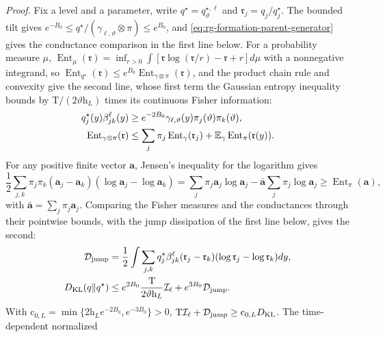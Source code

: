 \noindent\emph{Proof.}
Fix a level and a parameter, write \(q^\star=q^{\star,\ell}_\vartheta\) and
\(\mathfrak r_j=q_j/q^\star_j\). The bounded tilt gives
\(e^{-B_0}\le q^\star/(\gamma_{\ell,\vartheta}\otimes\pi)\le e^{B_0}\), and
\cref{eq:rg-formation-parent-generator} gives the conductance comparison in the
first line below. For a probability measure \(\mu\),
\(\operatorname{Ent}_\mu(\mathfrak r)=\inf_{r>0}\int[\mathfrak r\log(\mathfrak r/r)-\mathfrak r+r] d\mu\)
with a nonnegative integrand, so
\(\operatorname{Ent}_{q^\star}(\mathfrak r)\le e^{B_0}\operatorname{Ent}_{\gamma\otimes\pi}(\mathfrak r)\),
and the product chain rule and convexity give the second line, whose first
term the Gaussian entropy inequality bounds by
\(\mathrm T/(2\vartheta\mathrm h_L)\) times its continuous Fisher information:
\begin{align}
 q^\star_j(y)\beta_{jk}^\ell(y)
 &\ge e^{-2B_0}\gamma_{\ell,\vartheta}(y)\pi_j(\vartheta)\pi_k(\vartheta),
 \label{eq:rg-formation-conductance-comparison}\\
 \operatorname{Ent}_{\gamma\otimes\pi}(\mathfrak r)
 &\le\sum_j\pi_j\operatorname{Ent}_\gamma(\mathfrak r_j)
   +\mathbb E_\gamma\operatorname{Ent}_{\pi}(\mathfrak r(y)).
 \label{eq:rg-formation-product-entropy-bound}
\end{align}
For any positive finite vector \(\mathbf a\), Jensen's inequality for the
logarithm gives
\begin{equation}
 \frac12\sum_{j,k}\pi_j\pi_k
       (\mathbf a_j-\mathbf a_k)(\log\mathbf a_j-\log\mathbf a_k)
 =\sum_j\pi_j\mathbf a_j\log\mathbf a_j
       -\bar{\mathbf a}\sum_j\pi_j\log\mathbf a_j
 \ge \operatorname{Ent}_\pi(\mathbf a),
 \label{eq:rg-formation-categorical-entropy-bound}
\end{equation}
with \(\bar{\mathbf a}=\sum_j\pi_j\mathbf a_j\). Comparing the Fisher measures
and the conductances through their pointwise bounds, with the jump
dissipation of the first line below, gives the second:
\begin{align}
 \mathcal D_{\mathrm{jump}}
 &=\frac12\int\sum_{j,k}q^\star_j\beta_{jk}^\ell
           (\mathfrak r_j-\mathfrak r_k)(\log\mathfrak r_j-\log\mathfrak r_k) dy,
 \label{eq:rg-formation-jump-dissipation}\\
 D_{\mathrm{KL}}(q\Vert q^\star)&\le
 e^{2B_0}\frac{\mathrm T}{2\vartheta\mathrm h_L}\mathcal I_\ell
       +e^{3B_0}\mathcal D_{\mathrm{jump}}.
 \label{eq:rg-formation-joint-coercivity}
\end{align}
With \(\mathrm c_{0,L}=\min\{2\mathrm h_Le^{-2B_0},e^{-3B_0}\}>0\),
\(\mathrm T\mathcal I_\ell+\mathcal D_{\mathrm{jump}}\ge\mathrm c_{0,L}D_{\mathrm{KL}}\). The time-dependent normalized
